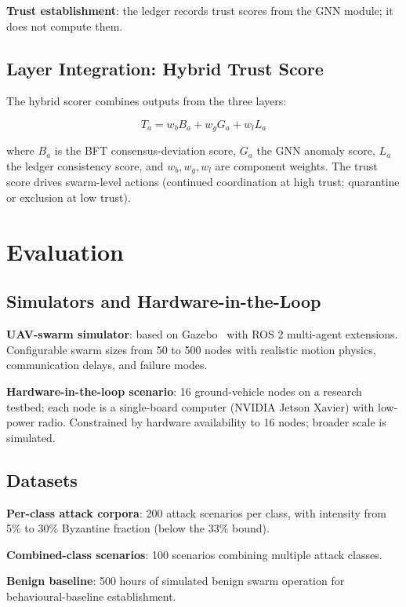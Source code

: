 \documentclass[sigconf,nonacm]{acmart}
\begin{document}
\textbf{Trust establishment}: the ledger records trust scores
from the GNN module; it does not compute them.

\subsection{Layer Integration: Hybrid Trust Score}

The hybrid scorer combines outputs from the three layers:

\begin{equation}
  T_a = w_b B_a + w_g G_a + w_l L_a
\end{equation}

where $B_a$ is the BFT consensus-deviation score, $G_a$ the GNN
anomaly score, $L_a$ the ledger consistency score, and
$w_b, w_g, w_l$ are component weights. The trust score drives
swarm-level actions (continued coordination at high trust;
quarantine or exclusion at low trust).

\section{Evaluation}

\subsection{Simulators and Hardware-in-the-Loop}

\textbf{UAV-swarm simulator}: based on Gazebo~\cite{gazebo2024}
with ROS 2 multi-agent extensions. Configurable swarm sizes from
50 to 500 nodes with realistic motion physics, communication
delays, and failure modes.

\textbf{Hardware-in-the-loop scenario}: 16 ground-vehicle nodes
on a research testbed; each node is a single-board computer
(NVIDIA Jetson Xavier) with low-power radio. Constrained by
hardware availability to 16 nodes; broader scale is simulated.

\subsection{Datasets}

\textbf{Per-class attack corpora}: 200 attack scenarios per class,
with intensity from 5\% to 30\% Byzantine fraction (below the
33\% bound).

\textbf{Combined-class scenarios}: 100 scenarios combining
multiple attack classes.

\textbf{Benign baseline}: 500 hours of simulated benign swarm
operation for behavioural-baseline establishment.
\end{document}
